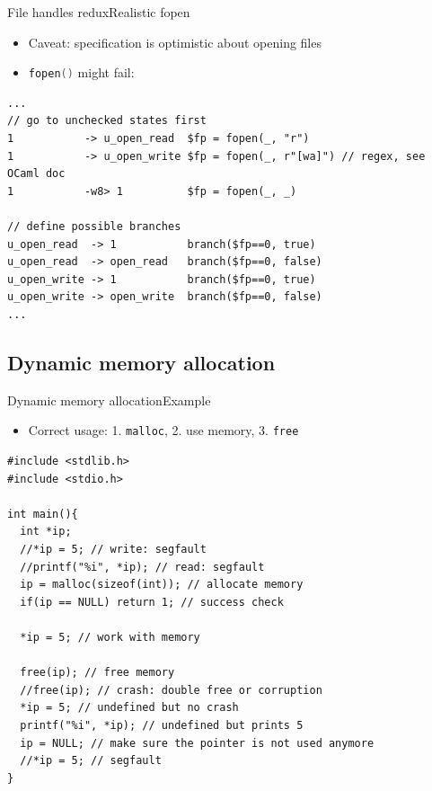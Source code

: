 \documentclass{beamer}
\newcommand{\inlineC}[1]{\lstinline[language=C]$#1$}
\begin{document}
\begin{frame}[fragile]{File handles redux}{Realistic fopen}
\begin{itemize}
\item Caveat: specification is optimistic about opening files
\item \inlineC{fopen()} might fail:
\end{itemize}
\begin{lstlisting}[basicstyle=\scriptsize\ttfamily]
...
// go to unchecked states first
1           -> u_open_read  $fp = fopen(_, "r")
1           -> u_open_write $fp = fopen(_, r"[wa]") // regex, see OCaml doc
1           -w8> 1          $fp = fopen(_, _)

// define possible branches
u_open_read  -> 1           branch($fp==0, true)
u_open_read  -> open_read   branch($fp==0, false)
u_open_write -> 1           branch($fp==0, true)
u_open_write -> open_write  branch($fp==0, false)
...
\end{lstlisting}
\end{frame}

\subsection{Dynamic memory allocation}

\begin{frame}[fragile]{Dynamic memory allocation}{Example}
\begin{itemize}
\item Correct usage: 1. \inlineC{malloc}, 2. use memory, 3. \inlineC{free}
\end{itemize}
\begin{lstlisting}[basicstyle=\scriptsize\ttfamily]
#include <stdlib.h>
#include <stdio.h>

int main(){
  int *ip;
  //*ip = 5; // write: segfault
  //printf("%i", *ip); // read: segfault
  ip = malloc(sizeof(int)); // allocate memory
  if(ip == NULL) return 1; // success check

  *ip = 5; // work with memory

  free(ip); // free memory
  //free(ip); // crash: double free or corruption
  *ip = 5; // undefined but no crash
  printf("%i", *ip); // undefined but prints 5
  ip = NULL; // make sure the pointer is not used anymore
  //*ip = 5; // segfault
}
\end{lstlisting}
\end{frame}
\end{document}
